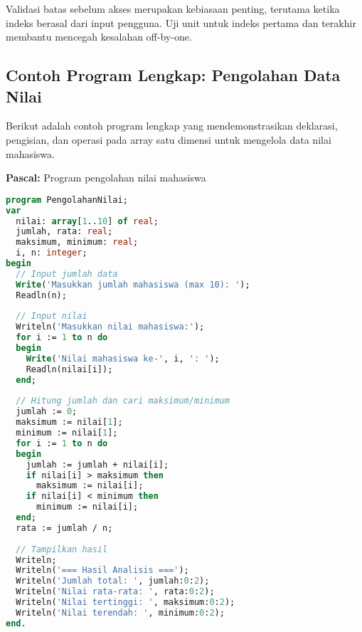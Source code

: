 \documentclass[../main.tex]{subfiles}
\begin{document}
Validasi batas sebelum akses merupakan kebiasaan penting, terutama ketika indeks berasal dari input pengguna. Uji unit untuk indeks pertama dan terakhir membantu mencegah kesalahan off-by-one.

\subsection{Contoh Program Lengkap: Pengolahan Data Nilai}

Berikut adalah contoh program lengkap yang mendemonstrasikan deklarasi, pengisian, dan operasi pada array satu dimensi untuk mengelola data nilai mahasiswa.

\textbf{Pascal:} Program pengolahan nilai mahasiswa
\begin{lstlisting}[language=Pascal, caption={Program lengkap array 1D di Pascal}]
program PengolahanNilai;
var
  nilai: array[1..10] of real;
  jumlah, rata: real;
  maksimum, minimum: real;
  i, n: integer;
begin
  // Input jumlah data
  Write('Masukkan jumlah mahasiswa (max 10): ');
  Readln(n);
  
  // Input nilai
  Writeln('Masukkan nilai mahasiswa:');
  for i := 1 to n do
  begin
    Write('Nilai mahasiswa ke-', i, ': ');
    Readln(nilai[i]);
  end;
  
  // Hitung jumlah dan cari maksimum/minimum
  jumlah := 0;
  maksimum := nilai[1];
  minimum := nilai[1];
  for i := 1 to n do
  begin
    jumlah := jumlah + nilai[i];
    if nilai[i] > maksimum then
      maksimum := nilai[i];
    if nilai[i] < minimum then
      minimum := nilai[i];
  end;
  rata := jumlah / n;
  
  // Tampilkan hasil
  Writeln;
  Writeln('=== Hasil Analisis ===');
  Writeln('Jumlah total: ', jumlah:0:2);
  Writeln('Nilai rata-rata: ', rata:0:2);
  Writeln('Nilai tertinggi: ', maksimum:0:2);
  Writeln('Nilai terendah: ', minimum:0:2);
end.
\end{lstlisting}
\end{document}

